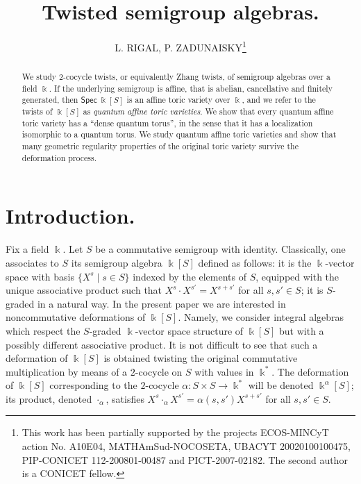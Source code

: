 \documentclass[twoside,11pt]{article}
\renewcommand{\k}{\Bbbk}
\newcommand{\aujourdhui}{09/09/2014}
\newcommand{\titre}{Twisted semigroup algebras.}
\newcommand{\fichier}{lrpz2-preSV.tex}
\begin{document}

\title{{\vspace{-1.5cm} \bf \titre}}
\author{L. RIGAL, P. ZADUNAISKY\footnote{This work has been partially supported by the
projects ECOS-MINCyT action No. A10E04, MATHAmSud-NOCOSETA, UBACYT
20020100100475, PIP-CONICET 112-200801-00487 and PICT-2007-02182. The second author is a
CONICET fellow.}}
\date{}
\maketitle

\begin{abstract}
We study 2-cocycle twists, or equivalently Zhang twists, of semigroup algebras over a
field $\k$. If the underlying semigroup is affine, that is abelian, cancellative and
finitely generated, then $\mathsf{Spec}~\k[S]$ is an affine toric variety over $\k$, and
we refer to the twists of $\k[S]$ as \emph{quantum affine toric varieties}. We show that
every quantum affine toric variety has a ``dense quantum torus'', in the sense that it
has a localization isomorphic to a quantum torus. We study quantum affine toric varieties
and show that many geometric regularity properties of the original toric variety survive 
the deformation process.

\tableofcontents
\end{abstract}

\section*{Introduction.}

Fix a field $\k$. Let $S$ be a commutative semigroup with identity. Classically, one
associates to $S$ its semigroup algebra $\k[S]$ defined as follows: it is the
$\k$-vector space with basis $\{X^s \mid s\in S\}$ indexed by the elements of $S$,
equipped with the unique associative product such that $X^s \cdot X^{s'} = X^{s+s'}$ for
all $s,s' \in S$; it is $S$-graded in a natural way. In the present paper we are
interested in noncommutative deformations of $\k[S]$. Namely, we consider integral
algebras which respect the $S$-graded $\k$-vector space structure of $\k[S]$ but
with a possibly different associative product. It is not difficult to see that such a
deformation of $\k[S]$ is obtained twisting the original commutative multiplication by
means of a $2$-cocycle on $S$ with values in $\k^\ast$. The deformation of $\k[S]$
corresponding to the $2$-cocycle $\alpha :S \times S \longrightarrow \k^\ast$ will be denoted
$\k^\alpha[S]$; its product, denoted $\cdot_\alpha$, satisfies $X^s \cdot_\alpha X^{s'} =
\alpha(s,s') X^{s+s'}$ for all $s,s' \in S$.
\end{document}
